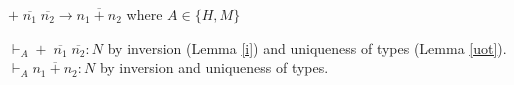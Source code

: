 \begin{case}
$+\;\overline{n_{1}}\;\overline{n_{2}}\rightarrow\overline{n_{1}+n_{2}}$ where $A\in\lbrace H,M\rbrace$

$\vdash_{A}+\;\overline{n_{1}}\;\overline{n_{2}}:N$ by inversion (Lemma \ref{i}) and uniqueness of types (Lemma \ref{uot}).  $\vdash_{A}\overline{n_{1}+n_{2}}:N$ by inversion and uniqueness of types.
\end{case}